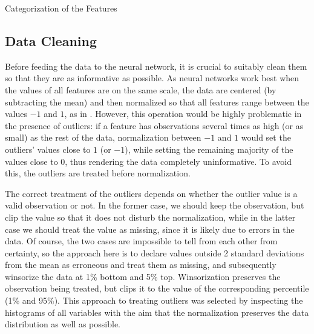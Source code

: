 		\begin{table}
			\resizebox{\textwidth}{!}{}
			\caption{Categorization of the Features}
			\label{tab:meta}
		\end{table}
	
	\subsection{Data Cleaning}
	
		Before feeding the data to the neural network, it is crucial to suitably clean them so that they are as informative as possible. As neural networks work best when the values of all features are on the same scale, the data are centered (by subtracting the mean) and then normalized so that all features range between the values $-1$ and $1$, as in \cite{gu2020empirical}. However, this operation would be highly problematic in the presence of outliers: if a feature has observations several times as high (or as small) as the rest of the data, normalization between $-1$ and $1$ would set the outliers' values close to $1$ (or $-1$), while setting the remaining majority of the values close to 0, thus rendering the data completely uninformative. To avoid this, the outliers are treated before normalization.
		
		The correct treatment of the outliers depends on whether the outlier value is a valid observation or not. In the former case, we should keep the observation, but clip the value so that it does not disturb the normalization, while in the latter case we should treat the value as missing, since it is likely due to errors in the data. Of course, the two cases are impossible to tell from each other from certainty, so the approach here is to declare values outside 2 standard deviations from the mean as erroneous and treat them as missing, and subsequently winsorize the data at 1\% bottom and 5\% top. Winsorization preserves the observation being treated, but clips it to the value of the corresponding percentile (1\% and 95\%). This approach to treating outliers was selected by inspecting the histograms of all variables with the aim that the normalization preserves the data distribution as well as possible.    
		
